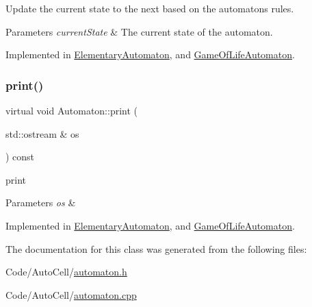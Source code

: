 Update the current state to the next based on the automaton\textquotesingle{}s rules.


\begin{DoxyParams}{Parameters}
{\em current\+State} & The current state of the automaton. \\
\hline
\end{DoxyParams}


Implemented in \mbox{\hyperlink{class_elementary_automaton_a338559546b22deef0f3eb3c0d7d20882}{Elementary\+Automaton}}, and \mbox{\hyperlink{class_game_of_life_automaton_ac806423a9e936950e2dabd6989575f1e}{Game\+Of\+Life\+Automaton}}.

\mbox{\label{class_automaton_a33107fc96cfe40a75db43b7403dd3194}} 
\subsubsection{\texorpdfstring{print()}{print()}}
{\footnotesize\ttfamily virtual void Automaton\+::print (\begin{DoxyParamCaption}\item[{std\+::ostream \&}]{os }\end{DoxyParamCaption}) const\hspace{0.3cm}{\ttfamily [pure virtual]}}



print 


\begin{DoxyParams}{Parameters}
{\em os} & \\
\hline
\end{DoxyParams}


Implemented in \mbox{\hyperlink{class_elementary_automaton_ab52f80f6998fd5324da2268d846b45cb}{Elementary\+Automaton}}, and \mbox{\hyperlink{class_game_of_life_automaton_a090e7935a13cb6f71a0331fff7cb6083}{Game\+Of\+Life\+Automaton}}.



The documentation for this class was generated from the following files\+:\begin{DoxyCompactItemize}
\item 
Code/\+Auto\+Cell/\mbox{\hyperlink{automaton_8h}{automaton.\+h}}\item 
Code/\+Auto\+Cell/\mbox{\hyperlink{automaton_8cpp}{automaton.\+cpp}}\end{DoxyCompactItemize}
